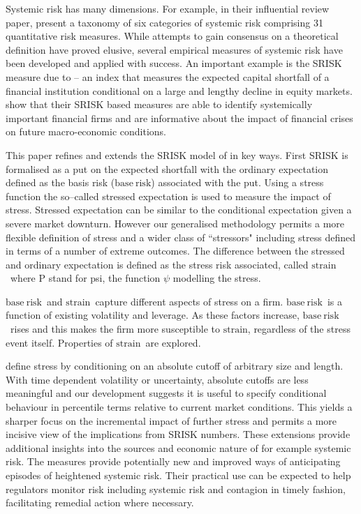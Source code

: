 \documentclass[authoryear]{elsarticle}
\newcommand{\br}{\ensuremath{\mathrm{base\ risk}}}
\newcommand{\pr}{\ensuremath{\mathrm{strain}}}
\begin{document}
Systemic risk has many dimensions. For example, in their influential review paper, \cite{Bisias2012} present a taxonomy of six categories of systemic risk comprising 31 quantitative risk measures. While attempts to gain consensus on a theoretical definition have proved elusive, several empirical measures of systemic risk have been developed and applied with  success.  An important example is the SRISK measure due to \cite{brownlees2015} -- an index that measures the expected capital shortfall of a financial institution conditional on a large and lengthy decline in equity markets. \cite{brownlees2015} show that their SRISK based measures are able to identify systemically important financial firms and are informative about the impact of financial crises on future macro-economic conditions. 

This paper refines and extends the SRISK model of \cite{brownlees2015} in  key ways. First SRISK is formalised  as a put on the expected shortfall with the ordinary expectation defined as the basis risk (\br) associated with the put.   Using a stress function  the so--called stressed expectation is used to measure the impact of stress.   Stressed expectation can be similar to the \cite{brownlees2015} conditional expectation given  a severe market downturn.  However our generalised methodology  permits a more flexible definition of stress and a wider class of ``stressors" including stress defined in terms of  a number of extreme outcomes.  The difference between the stressed and ordinary expectation is defined as the stress risk associated, called \pr\ where P stand for psi,  the function $\psi$ modelling the stress. 

\br\  and \pr\  capture different aspects of stress on a firm. \br\  is a function of existing volatility and leverage. As these factors increase, \br\  rises and this makes the firm more susceptible to \pr, regardless of the stress event itself.   Properties of \pr\  are explored.
   
\cite{brownlees2015} define stress by conditioning on an absolute cutoff of arbitrary size and length. With time dependent volatility or uncertainty, absolute cutoffs  are less meaningful and our development suggests  it is  useful to specify conditional behaviour in percentile terms relative to current market conditions. This yields a sharper focus on the incremental impact of further stress and permits a more incisive view of the  implications from SRISK numbers. These extensions provide additional insights into the sources and economic nature of for example systemic risk. The measures provide potentially new and improved ways of anticipating episodes of heightened systemic risk. Their practical use can be expected to help regulators monitor risk including systemic risk and contagion in timely fashion,   facilitating remedial action where necessary.
\end{document}

